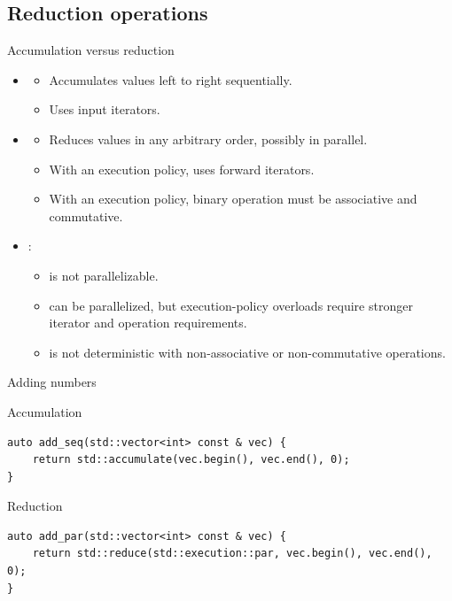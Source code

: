\subsection{Reduction operations}

\begin{frame}[t,fragile]{Accumulation versus reduction}
\begin{itemize}
    \item {}
      \begin{itemize}
        \item Accumulates values left to right sequentially.
        \item Uses input iterators.
      \end{itemize}

    \item {}
      \begin{itemize}
        \item Reduces values in any arbitrary order, possibly in parallel.
        \item With an execution policy, uses forward iterators.
        \item With an execution policy, binary operation  must be associative and commutative.
      \end{itemize}

    \item {}:
      \begin{itemize}
        \item {} is not parallelizable.
        \item {} can be parallelized, but execution-policy overloads require stronger iterator and operation requirements.
        \item {} is not deterministic with non-associative or non-commutative operations.
      \end{itemize}
\end{itemize}
\end{frame}

\begin{frame}[t,fragile]{Adding numbers}
\begin{block}{Accumulation}
\begin{lstlisting}
auto add_seq(std::vector<int> const & vec) {
    return std::accumulate(vec.begin(), vec.end(), 0);
}
\end{lstlisting}
\end{block}

\begin{block}{Reduction}
\begin{lstlisting}
auto add_par(std::vector<int> const & vec) {
    return std::reduce(std::execution::par, vec.begin(), vec.end(), 0);
}
\end{lstlisting}
\end{block}
\end{frame}


